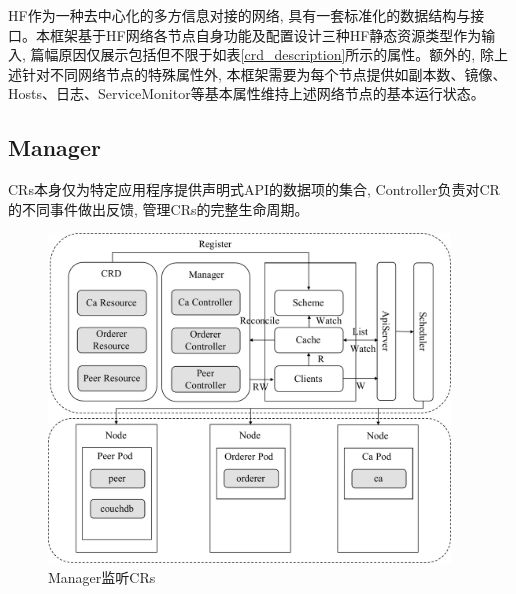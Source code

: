 HF作为一种去中心化的多方信息对接的网络, 具有一套标准化的数据结构与接口。本框架基于HF网络各节点自身功能及配置\footnotemark[1]\footnotemark[2]\footnotemark[3]设计三种HF静态资源类型作为输入, 篇幅原因仅展示包括但不限于如表\ref{crd_description}所示的属性。额外的, 除上述针对不同网络节点的特殊属性外, 本框架需要为每个节点提供如副本数、镜像、Hosts、日志、ServiceMonitor等基本属性维持上述网络节点的基本运行状态。


\subsection{Manager}

CRs本身仅为特定应用程序提供声明式API的数据项的集合, Controller负责对CR的不同事件做出反馈, 管理CRs的完整生命周期。

\begin{figure}[h] %
    \centering %
    \includegraphics[width=0.95\textwidth]{FIGs/chapter4/manager.pdf} %
    \caption{Manager监听CRs} %
    \label{manager} %
\end{figure}%

